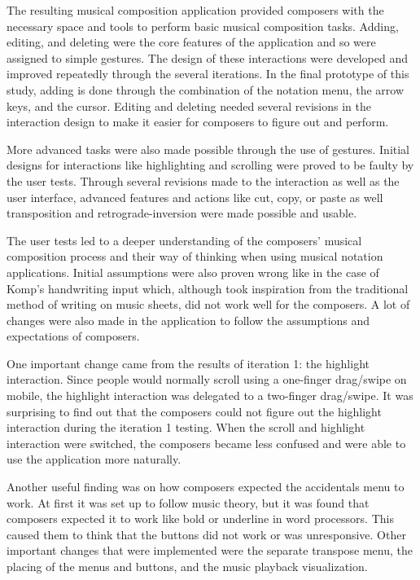 		The resulting musical composition application provided composers with the necessary space and tools to perform basic musical composition tasks. Adding, editing, and deleting were the core features of the application and so were assigned to simple gestures. The design of these interactions were developed and improved repeatedly through the several iterations. In the final prototype of this study, adding is done through the combination of the notation menu, the arrow keys, and the cursor. Editing and deleting needed several revisions in the interaction design to make it easier for composers to figure out and perform. 

		More advanced tasks were also made possible through the use of gestures. Initial designs for interactions like highlighting and scrolling were proved to be faulty by the user tests. Through several revisions made to the interaction as well as the user interface, advanced features and actions like cut, copy, or paste as well transposition and retrograde-inversion were made possible and usable. 

		The user tests led to a deeper understanding of the composers' musical composition process and their way of thinking when using musical notation applications. Initial assumptions were also proven wrong like in the case of Komp's handwriting input which, although took inspiration from the traditional method of writing on music sheets, did not work well for the composers. A lot of changes were also made in the application to follow the assumptions and expectations of composers. 

		One important change came from the results of iteration 1: the highlight interaction. Since people would normally scroll using a one-finger drag/swipe on mobile, the highlight interaction was delegated to a two-finger drag/swipe. It was surprising to find out that the composers could not figure out the highlight interaction during the iteration 1 testing. When the scroll and highlight interaction were switched, the composers became less confused and were able to use the application more naturally. 

		Another useful finding was on how composers expected the accidentals menu to work. At first it was set up to follow music theory, but it was found that composers expected it to work like bold or underline in word processors. This caused them to think that the buttons did not work or was unresponsive. Other important changes that were implemented were the separate transpose menu, the placing of the menus and buttons, and the music playback visualization. 

